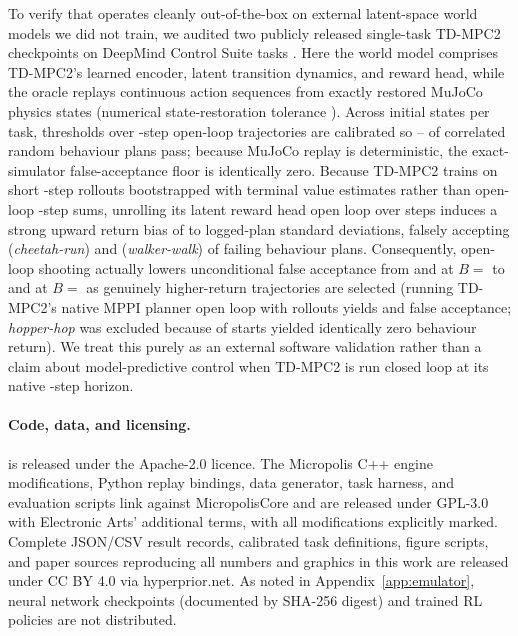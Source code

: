 

To verify that \hpd{} operates cleanly out-of-the-box on external latent-space world models we did not train, we audited two publicly released single-task TD-MPC2 checkpoints \citep{hansen2024tdmpc2,tdmpc2checkpoints} on DeepMind Control Suite tasks \citep{tunyasuvunakool2020dmcontrol}. Here the world model comprises TD-MPC2's learned encoder, latent transition dynamics, and reward head, while the oracle replays continuous action sequences from exactly restored MuJoCo physics states (numerical state-restoration tolerance \ExtOracleTolerance{}). Across \ExtStarts{} initial states per task, thresholds over \ExtHorizon-step open-loop trajectories are calibrated so \ExtAccLo{}--\ExtAccHi{} of correlated random behaviour plans pass; because MuJoCo replay is deterministic, the exact-simulator false-acceptance floor is identically zero. Because TD-MPC2 trains on short \ExtMppiHorizon-step rollouts bootstrapped with terminal value estimates rather than open-loop \ExtHorizon-step sums, unrolling its latent reward head open loop over \ExtHorizon{} steps induces a strong upward return bias of \WalkerResid{} to \CheetahResid{} logged-plan standard deviations, falsely accepting \CheetahFp{} (\emph{cheetah-run}) and \WalkerFp{} (\emph{walker-walk}) of failing behaviour plans. Consequently, open-loop shooting actually lowers unconditional false acceptance from \CheetahRandOneHack{} and \WalkerRandOneHack{} at $B ={}$ to \CheetahRandThouHack{} \ci{\CheetahRandThouHackCI} and \WalkerRandThouHack{} \ci{\WalkerRandThouHackCI} at $B ={}$ as genuinely higher-return trajectories are selected (running TD-MPC2's native MPPI planner open loop with \CheetahMppiB{} rollouts yields \CheetahMppiHack{} and \WalkerMppiHack{} false acceptance; \emph{hopper-hop} was excluded because \HopperZeroStarts{} of \ExtStarts{} starts yielded identically zero behaviour return). We treat this purely as an external software validation rather than a claim about model-predictive control when TD-MPC2 is run closed loop at its native \ExtMppiHorizon-step horizon.

\paragraph{Code, data, and licensing.}
\hpd{} is released under the Apache-2.0 licence. The Micropolis C++ engine modifications, Python replay bindings, data generator, task harness, and evaluation scripts link against MicropolisCore and are released under GPL-3.0 with Electronic Arts' additional terms, with all modifications explicitly marked. Complete JSON/CSV result records, calibrated task definitions, figure scripts, and paper sources reproducing all numbers and graphics in this work are released under CC BY 4.0 via hyperprior.net. As noted in Appendix~\ref{app:emulator}, neural network checkpoints (documented by SHA-256 digest) and trained RL policies are not distributed.

